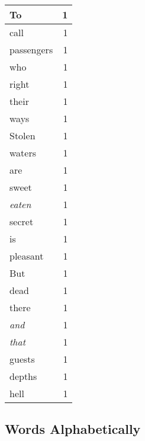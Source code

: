 \begin{center}
\begin{longtable}{l|r}
To & 1\\ \hline 
call & 1\\ \hline 
passengers & 1\\ \hline 
who & 1\\ \hline 
right & 1\\ \hline 
their & 1\\ \hline 
ways & 1\\ \hline 
Stolen & 1\\ \hline 
waters & 1\\ \hline 
are & 1\\ \hline 
sweet & 1\\ \hline 
\emph{eaten} & 1\\ \hline 
secret & 1\\ \hline 
is & 1\\ \hline 
pleasant & 1\\ \hline 
But & 1\\ \hline 
dead & 1\\ \hline 
there & 1\\ \hline 
\emph{and} & 1\\ \hline 
\emph{that} & 1\\ \hline 
guests & 1\\ \hline 
depths & 1\\ \hline 
hell & 1\\ \hline 
\end{longtable}  
\end{center}  


  
\normalsize  

  
  


\subsection{Words Alphabetically}

